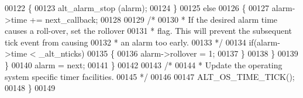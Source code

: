 \begin{DoxyCode}
00122       \{
00123         alt_alarm_stop (alarm);
00124       \}
00125       \textcolor{keywordflow}{else}
00126       \{
00127         alarm->time += next\_callback;
00128         
00129         \textcolor{comment}{/* }
00130 \textcolor{comment}{         * If the desired alarm time causes a roll-over, set the rollover}
00131 \textcolor{comment}{         * flag. This will prevent the subsequent tick event from causing}
00132 \textcolor{comment}{         * an alarm too early.}
00133 \textcolor{comment}{         */}
00134         \textcolor{keywordflow}{if}(alarm->time < _alt_nticks)
00135         \{
00136           alarm->rollover = 1;
00137         \}
00138       \}
00139     \}
00140     alarm = next;
00141   \}
00142 
00143   \textcolor{comment}{/* }
00144 \textcolor{comment}{   * Update the operating system specific timer facilities.}
00145 \textcolor{comment}{   */}
00146 
00147   ALT_OS_TIME_TICK();
00148 \}
00149 
\end{DoxyCode}
